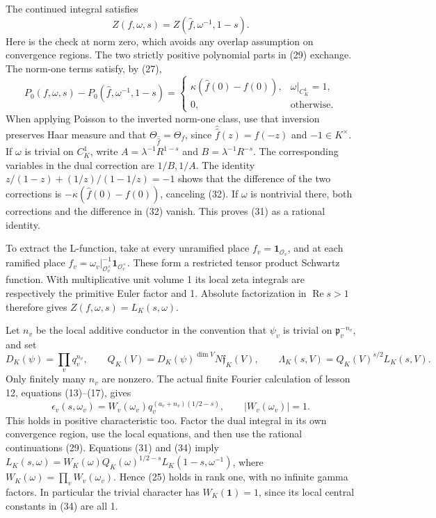 \documentclass[11pt,a4paper]{article}
\begin{document}
The continued integral satisfies \[
Z(f,\omega,s)=Z(\widehat f,\omega^{-1},1-s).
\tag{31}
\] Here is the check at norm zero, which avoids any overlap assumption
on convergence regions. The two strictly positive polynomial parts in
(29) exchange. The norm-one terms satisfy, by (27), \[
P_0(f,\omega,s)-P_0(\widehat f,\omega^{-1},1-s)
=\begin{cases}\kappa(\widehat f(0)-f(0)),&\omega|_{C_K^1}=1,\\0,&\text{otherwise}.
\end{cases}
\tag{32}
\] When applying Poisson to the inverted norm-one class, use that
inversion preserves Haar measure and that
\(\Theta_{\widehat{\widehat f}}=\Theta_f\), since
\(\widehat{\widehat f}(z)=f(-z)\) and \(-1\in K^\times\). If \(\omega\)
is trivial on \(C_K^1\), write \(A=\lambda^{-1}R^{1-s}\) and
\(B=\lambda^{-1}R^{-s}\). The corresponding variables in the dual
correction are \(1/B,1/A\). The identity \(z/(1-z)+(1/z)/(1-1/z)=-1\)
shows that the difference of the two corrections is
\(-\kappa(\widehat f(0)-f(0))\), canceling (32). If \(\omega\) is
nontrivial there, both corrections and the difference in (32) vanish.
This proves (31) as a rational identity.

To extract the L-function, take at every unramified place
\(f_v=\mathbf1_{\mathcal O_v}\), and at each ramified place
\(f_v=\omega_v|_{\mathcal O_v^\times}^{-1}\mathbf1_{\mathcal O_v^\times}\).
These form a restricted tensor product Schwartz function. With
multiplicative unit volume 1 its local zeta integrals are respectively
the primitive Euler factor and 1. Absolute factorization in
\(\operatorname{Re}s>1\) therefore gives
\(Z(f,\omega,s)=L_K(s,\omega)\).

Let \(n_v\) be the local additive conductor in the convention that
\(\psi_v\) is trivial on \(\mathfrak p_v^{-n_v}\), and set \[
D_K(\psi)=\prod_vq_v^{n_v},\qquad
Q_K(V)=D_K(\psi)^{\dim V}N\mathfrak f_K(V),\qquad
\Lambda_K(s,V)=Q_K(V)^{s/2}L_K(s,V).
\tag{33}
\] Only finitely many \(n_v\) are nonzero. The actual finite Fourier
calculation of lesson 12, equations (13)--(17), gives \[
\epsilon_v(s,\omega_v)=W_v(\omega_v)q_v^{(a_v+n_v)(1/2-s)},
\qquad |W_v(\omega_v)|=1.
\tag{34}
\] This holds in positive characteristic too. Factor the dual integral
in its own convergence region, use the local equations, and then use the
rational continuations (29). Equations (31) and (34) imply
\(L_K(s,\omega)=W_K(\omega)Q_K(\omega)^{1/2-s}L_K(1-s,\omega^{-1})\),
where \(W_K(\omega)=\prod_v W_v(\omega_v)\). Hence (25) holds in rank
one, with no infinite gamma factors. In particular the trivial character
has \(W_K(\mathbf1)=1\), since its local central constants in (34) are
all 1.
\end{document}
